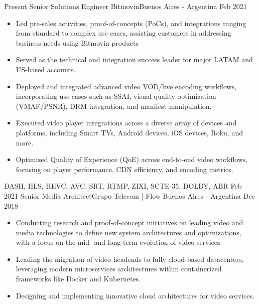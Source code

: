 %
%
%

\begin{experiences}
  \experience
  {Present}     {Senior Solutions Engineer} {\color{accentcolor}Bitmovin}{Buenos Aires - Argentina}
  {Feb 2021} {
    \begin{itemize}
      \item Led pre-sales activities, proof-of-concepts (PoCs), and integrations ranging from standard to complex use cases, assisting customers in addressing business needs using Bitmovin products
      \item Served as the technical and integration success leader for major LATAM and US-based accounts.
      \item Deployed and integrated advanced video VOD/live encoding workflows, incorporating use cases such as SSAI, visual quality optimization (VMAF/PSNR), DRM integration, and manifest manipulation.
      \item Executed video player integrations across a diverse array of devices and platforms, including Smart TVs, Android devices, iOS devices, Roku, and more.
      \item Optimized Quality of Experience (QoE) across end-to-end video workflows, focusing on player performance, CDN efficiency, and encoding metrics.   
      \end{itemize}
        }
      {DASH, HLS, HEVC, AVC, SRT, RTMP, ZIXI, SCTE-35, DOLBY, ABR}
        \emptySeparator
  \experience
    {Feb 2021}   {Senior Media Architect}{\color{accentcolor}Grupo Telecom | Flow }{Buenos Aires - Argentina}
    {Dec 2018} {
                      \begin{itemize}
                      \item Conducting research and proof-of-concept initiatives on leading video and media technologies to define new system architectures and optimizations, with a focus on the mid- and long-term evolution of video services
                      \item Leading the migration of video headends to fully cloud-based datacenters, leveraging modern microservices architectures within containerized frameworks like Docker and Kubernetes.
                      \item Designing and implementing innovative cloud architectures for video services.

\end{itemize}}
\end{experiences}
